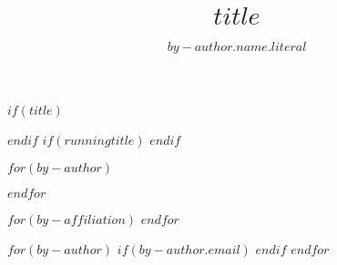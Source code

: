 
$if(title)$
\title{$title$}
$endif$
$if(runningtitle)$
$endif$

$for(by-author)$
  \author[$for(by-author.affiliations)$$it.number$$sep$,$endfor$$if(by-author.email)$,*$endif$$if(it.orcid)$\orcidlink{$it.orcid$}$endif$]
  {$by-author.name.literal$}
$endfor$

$for(by-affiliation)$
$endfor$

$for(by-author)$
$if(by-author.email)$
$endif$
$endfor$


